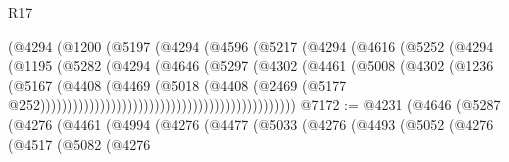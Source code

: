 \begin{lexlean}{R17}
\begin{coremodule}
                                            (@4294
                                              (@1200
                                                (@5197
                                                  (@4294
                                                    (@4596
                                                      (@5217
                                                        (@4294
                                                          (@4616
                                                            (@5252
                                                              (@4294
                                                                (@1195
                                                                  (@5282
                                                                    (@4294
                                                                      (@4646
                                                                        (@5297
                                                                          (@4302
                                                                            (@4461
                                                                              (@5008
                                                                                (@4302
                                                                                  (@1236
                                                                                    (@5167
                                                                                      (@4408
                                                                                        (@4469
                                                                                          (@5018
                                                                                            (@4408
                                                                                              (@2469
                                                                                                (@5177
                                                                                                  @252)))))))))))))))))))))))))))))))))))))))))))))))
@7172 := @4231
    (@4646
      (@5287
        (@4276
          (@4461
            (@4994
              (@4276
                (@4477
                  (@5033
                    (@4276
                      (@4493
                        (@5052
                          (@4276
                            (@4517
                              (@5082
                                (@4276

\end{coremodule}
\end{lexlean}
